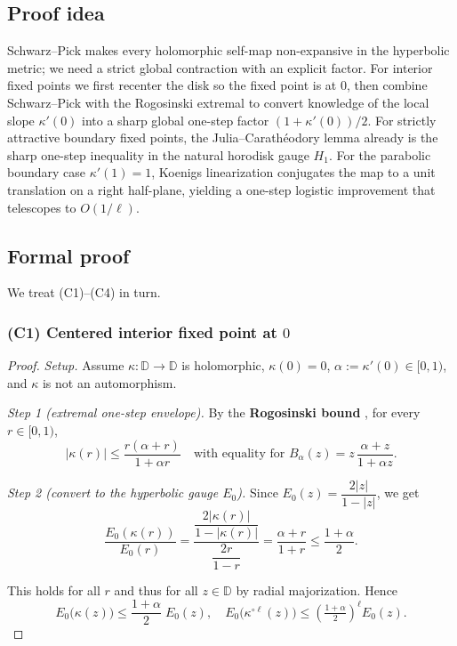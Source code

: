 \documentclass[11pt]{article}
\begin{document}
\subsection{Proof idea}

Schwarz–Pick makes every holomorphic self-map non-expansive in the hyperbolic metric; we need a strict global contraction with an explicit factor. For interior fixed points we first recenter the disk so the fixed point is at $0$, then combine Schwarz–Pick with the Rogosinski extremal to convert knowledge of the local slope $\kappa'(0)$ into a sharp global one-step factor $(1+\kappa'(0))/2$. For strictly attractive boundary fixed points, the Julia–Carathéodory lemma already is the sharp one-step inequality in the natural horodisk gauge $H_1$. For the parabolic boundary case $\kappa'(1)=1$, Koenigs linearization conjugates the map to a unit translation on a right half-plane, yielding a one-step logistic improvement that telescopes to $O(1/\ell)$.

\subsection{Formal proof}

We treat (C1)–(C4) in turn.

\subsubsection{(C1) Centered interior fixed point at $0$}

\begin{proof}
\textit{Setup.} Assume $\kappa:\mathbb{D}\to\mathbb{D}$ is holomorphic, $\kappa(0)=0$, $\alpha:=\kappa'(0)\in[0,1)$, and $\kappa$ is not an automorphism.

\textit{Step 1 (extremal one-step envelope).}
By the \textbf{Rogosinski bound} \cite{rogosinski1936}, for every $r\in[0,1)$,
\begin{equation}
|\kappa(r)| \leq \frac{r(\alpha+r)}{1+\alpha r}
\quad\text{with equality for }B_\alpha(z)=z\,\frac{\alpha+z}{1+\alpha z}.
\end{equation}

\textit{Step 2 (convert to the hyperbolic gauge $E_0$).}
Since $E_0(z)=\dfrac{2|z|}{1-|z|}$, we get
\begin{equation}
\frac{E_0(\kappa(r))}{E_0(r)} = \frac{\dfrac{2|\kappa(r)|}{1-|\kappa(r)|}}{\dfrac{2r}{1-r}} = \frac{\alpha+r}{1+r} \leq \frac{1+\alpha}{2}.
\end{equation}

This holds for all $r$ and thus for all $z\in\mathbb{D}$ by radial majorization. Hence
\begin{equation}
E_0\big(\kappa(z)\big) \leq \frac{1+\alpha}{2}\;E_0(z), \quad
E_0\big(\kappa^{\circ \ell}(z)\big) \leq \left(\tfrac{1+\alpha}{2}\right)^{\ell}E_0(z).
\end{equation}
\end{proof}
\end{document}
